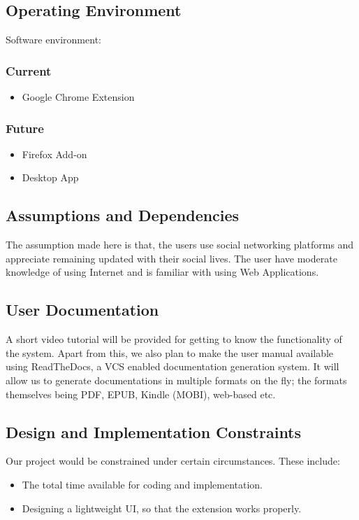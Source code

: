 \documentclass[12pt]{article}
\begin{document}
\subsection{Operating Environment}
Software environment:

    \subsubsection{Current}
    \begin{itemize}
    
    \item Google Chrome Extension
    \end{itemize}
    \subsubsection{Future}
    \begin{itemize}
        \item Firefox Add-on
    \item Desktop App
    \end{itemize}
    


\subsection{Assumptions and Dependencies}
The assumption made here is that, the users use social networking platforms and appreciate remaining updated with their social lives. The user have moderate knowledge of using Internet and
is familiar with using Web Applications.

\subsection{User Documentation}
A short video tutorial will be provided for getting to know the functionality of the system. Apart from this, we also plan to make the user manual available using ReadTheDocs, a VCS enabled documentation generation system. It will allow us to generate documentations in multiple formats on the fly; the formats themselves being PDF, EPUB, Kindle (MOBI), web-based etc.

\subsection{Design and Implementation Constraints}
Our project would be constrained under certain circumstances. These
include:
\begin{itemize}
    \item  The total time available for coding and implementation.

    \item Designing a lightweight UI, so that the extension works properly.
\end{itemize}
\end{document}
